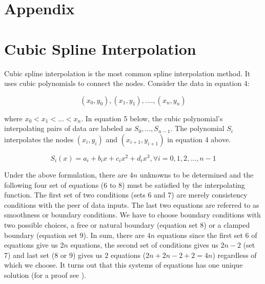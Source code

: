 \documentclass[12pt]{article}
\newcommand{\1}{\mathbbm 1}
\begin{document}
		\newpage
		
		
		
		
		
		
		
		
		
		
		
		
		\section*{Appendix}
		
		
		\section*{Cubic Spline Interpolation}
		
		Cubic spline interpolation is the most common spline interpolation method. It uses cubic polynomials to connect the nodes. Consider the data in equation 4:
		
		\begin{equation}
			(x_{0}, y_{0}), (x_{1}, y_{1}), .... , (x_{n}, y_{n})
		\end{equation}
		
		
		where $x_{0} < x_{1} < ... < x_{n}$. In equation 5 below, the cubic polynomial's interpolating pairs of data are labeled as $S_{0},..., S_{n-1}$. The polynomial $S_{i}$ interpolates the nodes $(x_{i}, y_{i})$ and $(x_{i+1}, y_{i+1})$ in equation 4 above.
		
		
		\begin{equation}
			S_{i}(x) = a_{i} + b_{i}x + c_{i}x^{2} + d_{i}x^{3}, \forall i = 0, 1, 2, ... ,n-1
		\end{equation}
		
		
		Under the above formulation, there are $4n$ unknowns to be determined and the following four set of equations (6 to 8) must be satisfied by the interpolating function. The first set of two conditions (sets 6 and 7) are merely consistency conditions with the peer of data inputs. The last two equations are referred to as smoothness or boundary conditions. We have to choose boundary conditions with two possible choices, a free or natural boundary (equation set 8) or a clamped boundary (equation set 9). In sum, there are $4n$ equations since the first set 6 of equations give us $2n$ equations, the second set of conditions gives us $2n-2$ (set 7) and last set (8 or 9) gives us $2$ equations ($2n + 2n -2 + 2 = 4n$) regardless of which we choose. It turns out that this systems of equations has one unique solution (for a proof see \cite{burden2015numerical}).
		
\end{document}
